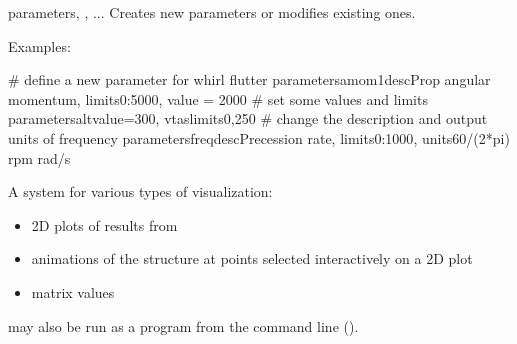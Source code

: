 \begin{cmdref}{parameters}{, , ...}
Creates new parameters or modifies existing ones.
\begin{subopts}
\end{subopts}
Examples:
\begin{example}
   # define a new parameter for whirl flutter
   parameters{amom1{desc{Prop angular momentum}, limits{0:5000}, value = 2000}}
	# set some values and limits
	parameters{alt{value=300}, vtas{limits{0,250}}}
	# change the description and output units of frequency
   parameters{freq{desc{Precession rate}, limits{0:1000},
	   units{60/(2*pi) rpm rad/s}}}
\end{example}
\end{cmdref}


{A system for various types of visualization:
\begin{itemize}
\item 2D plots of results from 
\item animations of the structure at points selected interactively on a 2D plot
\item matrix values
\end{itemize}
 may also be run as a program from the command line
().}

